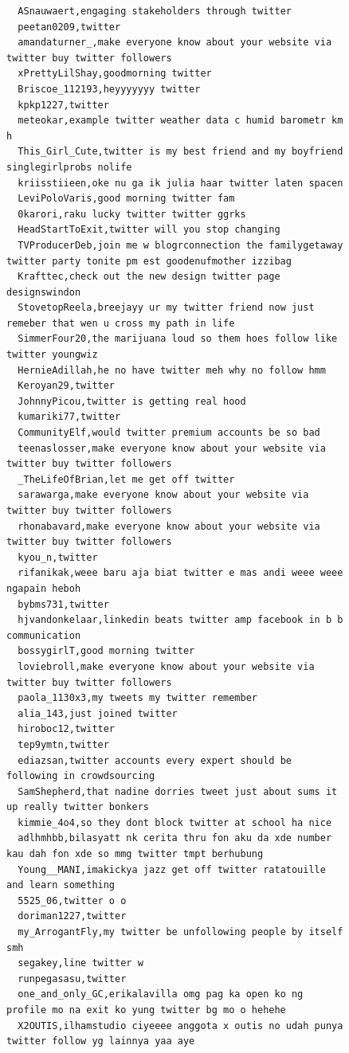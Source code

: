 \begin{figure}[htpb]
\begin{verbatim}
  ASnauwaert,engaging stakeholders through twitter
  peetan0209,twitter
  amandaturner_,make everyone know about your website via twitter buy twitter followers
  xPrettyLilShay,goodmorning twitter
  Briscoe_112193,heyyyyyyy twitter
  kpkp1227,twitter
  meteokar,example twitter weather data c humid barometr km h
  This_Girl_Cute,twitter is my best friend and my boyfriend singlegirlprobs nolife
  kriisstiieen,oke nu ga ik julia haar twitter laten spacen
  LeviPoloVaris,good morning twitter fam
  0karori,raku lucky twitter twitter ggrks
  HeadStartToExit,twitter will you stop changing
  TVProducerDeb,join me w blogrconnection the familygetaway twitter party tonite pm est goodenufmother izzibag
  Krafttec,check out the new design twitter page designswindon
  StovetopReela,breejayy ur my twitter friend now just remeber that wen u cross my path in life
  SimmerFour20,the marijuana loud so them hoes follow like twitter youngwiz
  HernieAdillah,he no have twitter meh why no follow hmm
  Keroyan29,twitter
  JohnnyPicou,twitter is getting real hood
  kumariki77,twitter
  CommunityElf,would twitter premium accounts be so bad
  teenaslosser,make everyone know about your website via twitter buy twitter followers
  _TheLifeOfBrian,let me get off twitter
  sarawarga,make everyone know about your website via twitter buy twitter followers
  rhonabavard,make everyone know about your website via twitter buy twitter followers
  kyou_n,twitter
  rifanikak,weee baru aja biat twitter e mas andi weee weee ngapain heboh
  bybms731,twitter
  hjvandonkelaar,linkedin beats twitter amp facebook in b b communication
  bossygirlT,good morning twitter
  loviebroll,make everyone know about your website via twitter buy twitter followers
  paola_1130x3,my tweets my twitter remember
  alia_143,just joined twitter
  hiroboc12,twitter
  tep9ymtn,twitter
  ediazsan,twitter accounts every expert should be following in crowdsourcing
  SamShepherd,that nadine dorries tweet just about sums it up really twitter bonkers
  kimmie_4o4,so they dont block twitter at school ha nice
  adlhmhbb,bilasyatt nk cerita thru fon aku da xde number kau dah fon xde so mmg twitter tmpt berhubung
  Young__MANI,imakickya jazz get off twitter ratatouille and learn something
  5525_06,twitter o o
  doriman1227,twitter
  my_ArrogantFly,my twitter be unfollowing people by itself smh
  segakey,line twitter w
  runpegasasu,twitter
  one_and_only_GC,erikalavilla omg pag ka open ko ng profile mo na exit ko yung twitter bg mo o hehehe
  X2OUTIS,ilhamstudio ciyeeee anggota x outis no udah punya twitter follow yg lainnya yaa aye

\end{verbatim}
\end{figure}
